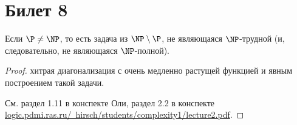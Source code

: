\setcounter{section}{7}
\section{Билет 8}
	\begin{theorem}
		Если $\P \neq \NP$, то есть задача из $\NP \setminus \P$, не являющаяся $\NP$-трудной (и, следовательно, не являющаяся $\NP$-полной).
	\end{theorem}
	\begin{proof}
		\TODO хитрая диагонализация с очень медленно растущей функцией и явным построением такой задачи.

		См. раздел 1.11 в конспекте Оли, раздел 2.2 в конспекте \href{http://logic.pdmi.ras.ru/~hirsch/students/complexity1/lecture2.pdf}{logic.pdmi.ras.ru/~hirsch/students/complexity1/lecture2.pdf}.
	\end{proof}
